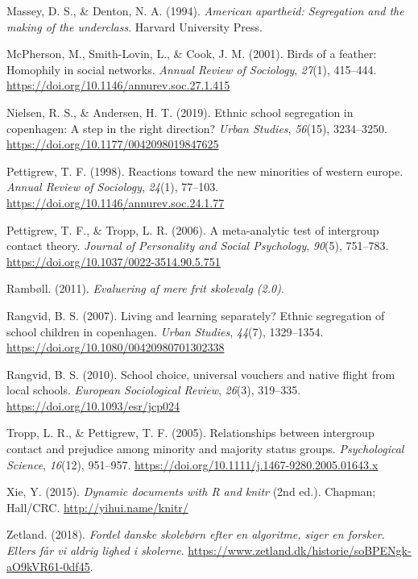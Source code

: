 \documentclass[
]{book}
\newlength{\cslhangindent}
\newlength{\cslentryspacingunit} %
\newenvironment{CSLReferences}[2] %
 {%
  \setlength{\parindent}{0pt}
  \ifodd #1
  \let\oldpar\par
  \def\par{\hangindent=\cslhangindent\oldpar}
  \fi
  \setlength{\parskip}{#2\cslentryspacingunit}
 }%
 {}
\begin{document}
\begin{CSLReferences}{1}{0}
\leavevmode{}%
Massey, D. S., \& Denton, N. A. (1994). \emph{American apartheid: Segregation and the making of the underclass}. Harvard University Press.

\leavevmode{}%
McPherson, M., Smith-Lovin, L., \& Cook, J. M. (2001). Birds of a feather: Homophily in social networks. \emph{Annual Review of Sociology}, \emph{27}(1), 415--444. \url{https://doi.org/10.1146/annurev.soc.27.1.415}

\leavevmode{}%
Nielsen, R. S., \& Andersen, H. T. (2019). Ethnic school segregation in copenhagen: A step in the right direction? \emph{Urban Studies}, \emph{56}(15), 3234--3250. \url{https://doi.org/10.1177/0042098019847625}

\leavevmode{}%
Pettigrew, T. F. (1998). Reactions toward the new minorities of western europe. \emph{Annual Review of Sociology}, \emph{24}(1), 77--103. \url{https://doi.org/10.1146/annurev.soc.24.1.77}

\leavevmode{}%
Pettigrew, T. F., \& Tropp, L. R. (2006). A meta-analytic test of intergroup contact theory. \emph{Journal of Personality and Social Psychology}, \emph{90}(5), 751--783. \url{https://doi.org/10.1037/0022-3514.90.5.751}

\leavevmode{}%
Rambøll. (2011). \emph{Evaluering af mere frit skolevalg (2.0)}.

\leavevmode{}%
Rangvid, B. S. (2007). Living and learning separately? Ethnic segregation of school children in copenhagen. \emph{Urban Studies}, \emph{44}(7), 1329--1354. \url{https://doi.org/10.1080/00420980701302338}

\leavevmode{}%
Rangvid, B. S. (2010). School choice, universal vouchers and native flight from local schools. \emph{European Sociological Review}, \emph{26}(3), 319--335. \url{https://doi.org/10.1093/esr/jcp024}

\leavevmode{}%
Tropp, L. R., \& Pettigrew, T. F. (2005). Relationships between intergroup contact and prejudice among minority and majority status groups. \emph{Psychological Science}, \emph{16}(12), 951--957. \url{https://doi.org/10.1111/j.1467-9280.2005.01643.x}

\leavevmode{}%
Xie, Y. (2015). \emph{Dynamic documents with {R} and knitr} (2nd ed.). Chapman; Hall/CRC. \url{http://yihui.name/knitr/}

\leavevmode{}%
Zetland. (2018). \emph{Fordel danske skolebørn efter en algoritme, siger en forsker. Ellers får vi aldrig lighed i skolerne}. \url{https://www.zetland.dk/historie/soBPENgk-aO9kVR61-0df45}.

\end{CSLReferences}
\end{document}
